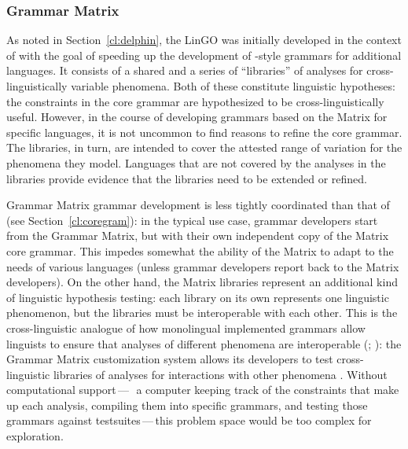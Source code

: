 \documentclass[output=paper,nonflat]{langsci/langscibook}
\begin{document}
\subsubsection{Grammar Matrix}
\label{cl:lang-doc:gmcs}

As noted in Section~\ref{cl:delphin}, the LinGO 
\citep{BFO2002a-u,BDFPS2010a-u} was initially developed in
the context of  with the goal of speeding up the
development of \delphin-style grammars for additional languages. It
consists of a shared  and a series of ``libraries'' of
analyses for cross-linguistically variable phenomena. Both of these
constitute linguistic hypotheses: the constraints
in the core grammar are hypothesized to be cross-linguistically
useful. However, in the course of developing grammars based on the
Matrix for specific languages, it is not uncommon to find reasons to
refine the core grammar. The libraries, in turn, are intended to 
cover the attested range of variation for the phenomena they model.
Languages that are not covered by the analyses in the libraries provide
evidence that the libraries need to be extended or refined. 

Grammar Matrix grammar development is less tightly coordinated than
that of  (see Section~\ref{cl:coregram}): in the typical use case,
grammar developers start from the Grammar Matrix, but with their own
independent copy of the Matrix core grammar. This impedes somewhat the
ability of the Matrix to adapt to the needs of various languages
(unless grammar developers report back to the Matrix developers).  On
the other hand, the Matrix libraries represent an additional kind of
linguistic hypothesis testing: each library on its own represents one
linguistic phenomenon, but the libraries must be interoperable with
each other. This is the cross-linguistic analogue of how monolingual
implemented grammars allow linguists to ensure that analyses of
different phenomena are interoperable
(\citealt[p.439--440]{Mueller99a}; \citealt{Bender2008c}): the Grammar Matrix customization
system allows its developers to test cross-linguistic libraries of
analyses for interactions with other phenomena
\citep{BFO2011a-u,Bender:16}. Without computational
support\,---\,\ie\ a computer keeping track of the constraints that
make up each analysis, compiling them into specific grammars, and
testing those grammars against testsuites\,---\,this problem space
would be too complex for exploration.
\end{document}
